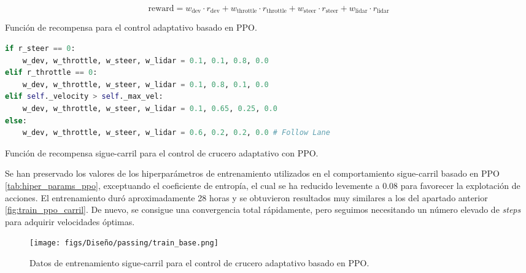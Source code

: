   \begin{myequation}[h]
    \begin{equation} 
      \text{reward} = w_{\text{dev}} \cdot r_{\text{dev}} + w_{\text{throttle}} \cdot r_{\text{throttle}} + w_{\text{steer}} \cdot r_{\text{steer}} + w_{\text{lidar}} \cdot r_{\text{lidar}}
    \end{equation} 
    \caption{Función de recompensa para el control adaptativo basado en \ac{PPO}.}
\label{eq:rew_ppo_adp}
  \end{myequation}

\begin{code}[H]
\begin{lstlisting}[language=Python]
if r_steer == 0:
    w_dev, w_throttle, w_steer, w_lidar = 0.1, 0.1, 0.8, 0.0
elif r_throttle == 0:
    w_dev, w_throttle, w_steer, w_lidar = 0.1, 0.8, 0.1, 0.0
elif self._velocity > self._max_vel:
    w_dev, w_throttle, w_steer, w_lidar = 0.1, 0.65, 0.25, 0.0
else:
    w_dev, w_throttle, w_steer, w_lidar = 0.6, 0.2, 0.2, 0.0 # Follow Lane
\end{lstlisting}
\caption[Función de recompensa sigue-carril para el control de crucero adaptativo con \ac{PPO}]{Función de recompensa sigue-carril para el control de crucero adaptativo  con \ac{PPO}.}
\label{cod:rew_carril_ppo_passing}
\end{code}

Se han preservado los valores de los hiperparámetros de entrenamiento utilizados en el comportamiento sigue-carril basado en \ac{PPO} \ref{tab:hiper_params_ppo}, exceptuando el coeficiente de entropía, el cual se ha reducido levemente a 0.08 para favorecer la explotación de acciones. El entrenamiento duró aproximadamente 28 horas y se obtuvieron resultados muy similares a los del apartado anterior \ref{fig:train_ppo_carril}. De nuevo, se consigue una convergencia total rápidamente, pero seguimos necesitando un número elevado de \textit{steps} para adquirir velocidades óptimas.

\begin{figure}[ht]
\centering
\texttt{[image: figs/Diseño/passing/train\_base.png]}
\caption{Datos de entrenamiento sigue-carril para el control de crucero adaptativo basado en \ac{PPO}.}
\label{fig:passing_train_base}
\end{figure}

